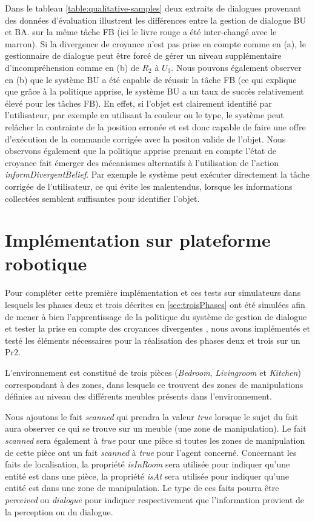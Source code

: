 \documentclass[a4paper,11pt,twoside]{StyleThese}
\begin{document}
%
Dans le tableau \ref{table:qualitative-samples} deux extraits de dialogues provenant des données d'évaluation illustrent les différences entre la gestion de dialogue BU et BA. sur la même tâche FB (ici le livre rouge a été inter-changé avec le marron). Si la divergence de croyance n'est pas prise en compte comme en (a), le gestionnaire de dialogue peut être forcé de gérer un niveau supplémentaire d'incompréhension comme en (b) de $R_2$ à $U_3$. 
Nous pouvons également observer en (b) que le système BU a été capable de réussir la tâche FB (ce qui explique que grâce à la politique apprise, le système BU a un taux de succès relativement élevé pour les tâches FB). En effet, si l'objet est clairement identifié par l'utilisateur, par exemple en utilisant la couleur ou le type, le système peut relâcher la contrainte de la position erronée et est donc capable de faire une offre d'exécution de la commande corrigée avec la positon valide de l'objet.
Nous observons également que la politique apprise prenant en compte l'état de croyance fait émerger des mécanismes alternatifs à l'utilisation de l'action \textit{informDivergentBelief}. Par exemple le système peut exécuter directement la tâche corrigée de l'utilisateur, ce qui évite les malentendus, lorsque les informations collectées semblent suffisantes pour identifier l'objet.



\section{Implémentation sur plateforme robotique}


Pour compléter cette première implémentation et ces tests sur simulateurs dans lesquels les phases deux et trois décrites en \ref{sec:troisPhases} ont été simulées afin de mener à bien l'apprentissage de la politique du système de gestion de dialogue \cite{simpar_2014} et tester la prise en compte des croyances divergentes \cite{Ferreira2015}, nous avons implémentés et testé les éléments nécessaires pour la réalisation des phases deux et trois sur un Pr2.

L'environnement est constitué de trois pièces (\textit{Bedroom}, \textit{Livingroom} et \textit{Kitchen}) correspondant à des zones, dans lesquels ce trouvent des zones de manipulations définies au niveau des différents meubles présents dans l'environnement.

Nous ajoutons le fait \textit{scanned} qui prendra la valeur \textit{true} lorsque 
le sujet du fait aura observer ce qui se trouve sur un meuble (une zone de manipulation). Le fait \textit{scanned} sera également à \textit{true} pour une pièce si toutes les zones de manipulation de cette pièce ont un fait \textit{scanned} à \textit{true} pour l'agent concerné.
Concernant les faits de localisation, la propriété \textit{isInRoom} sera utilisée pour indiquer qu'une entité est dans une pièce, la propriété \textit{isAt} sera utilisée pour indiquer qu'une entité est dans une zone de manipulation. Le type de ces faits pourra être \textit{perceived} ou \textit{dialogue} pour indiquer respectivement que l'information provient de la perception ou du dialogue.
\end{document}
